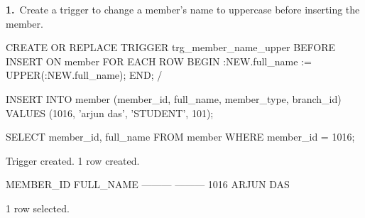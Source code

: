 \noindent\begin{minipage}{\linewidth}
\begingroup{}
{\fontsize{14}{17}\selectfont\textbf{1.}}\ Create a trigger to change a member's name to uppercase before inserting the member.\par
\endgroup\vspace{12pt}


\begin{sqlcode}
CREATE OR REPLACE TRIGGER trg_member_name_upper
BEFORE INSERT ON member
FOR EACH ROW
BEGIN
   :NEW.full_name := UPPER(:NEW.full_name);
END;
/

INSERT INTO member (member_id, full_name, member_type, branch_id)
VALUES (1016, 'arjun das', 'STUDENT', 101);

SELECT member_id, full_name FROM member WHERE member_id = 1016;
\end{sqlcode}

\vspace{18pt}


\begin{sqlout}[fontsize=\small]
Trigger created.
1 row created.

MEMBER_ID  FULL_NAME
---------  ---------
     1016  ARJUN DAS

1 row selected.
\end{sqlout}
\end{minipage}\par\vspace{24pt}

